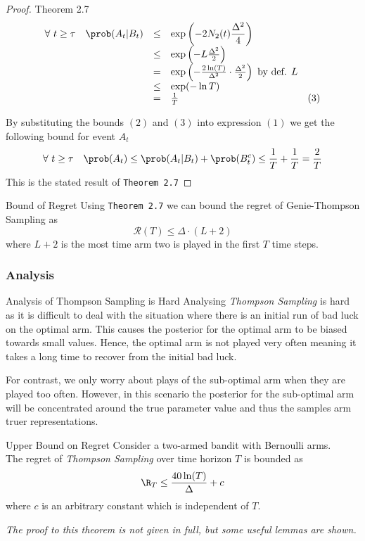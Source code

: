 \documentclass[11pt,a4paper]{article}
\begin{document}
\begin{proof}{Theorem 2.7}
  \[\begin{array}{rrcll}
    \forall\ t\geq\tau&\prob(A_t|B_t)&\leq&\exp\left(-2N_2(t)\dfrac{\Delta^2}4\right)\\
    &&\leq&\exp\left(-L\frac{\Delta^2}2\right)\\
    &&=&\exp\left(-\frac{2\ln(T)}{\Delta^2}\cdot\frac{\Delta^2}2\right)\text{ by def. }L\\
    &&\leq&\exp(-\ln T)\\
    &&=&\frac1T&(3)
  \end{array}\]
  \par By substituting the bounds $(2)$ and $(3)$ into expression $(1)$ we get the following bound for event $A_t$
  \[ \forall\ t\geq\tau\quad\prob(A_t)\leq\prob(A_t|B_t)+\prob(B_t^c)\leq\frac1T+\frac1T=\frac2T \]
  This is the stated result of \texttt{Theorem 2.7} \proved
\end{proof}

\begin{proposition}{Bound of Regret}
  Using \texttt{Theorem 2.7} we can bound the regret of Genie-Thompson Sampling as
  \[ \mathcal{R}(T)\leq\Delta\cdot(L+2) \]
  where $L+2$ is the most time arm two is played in the first $T$ time steps.
\end{proposition}

\subsubsection{Analysis}

\begin{remark}{Analysis of Thompson Sampling is Hard}
  Analysing \textit{Thompson Sampling} is hard as it is difficult to deal with the situation where there is an initial run of bad luck on the optimal arm. This causes the posterior for the optimal arm to be biased towards small values. Hence, the optimal arm is not played very often meaning it takes a long time to recover from the initial bad luck.
  \par For contrast, we only worry about plays of the sub-optimal arm when they are played too often. However, in this scenario the posterior for the sub-optimal arm will be concentrated around the true parameter value and thus the samples arm truer representations.
\end{remark}

\begin{theorem}{Upper Bound on Regret}
  Consider a two-armed bandit with Bernoulli arms.\\
  The regret of \textit{Thompson Sampling} over time horizon $T$ is bounded as
  \[ \R_T\leq\frac{40\ln(T)}\Delta+c \]
  where $c$ is an arbitrary constant which is independent of $T$.
  \par\textit{The proof to this theorem is not given in full, but some useful lemmas are shown.}
\end{theorem}
\end{document}
